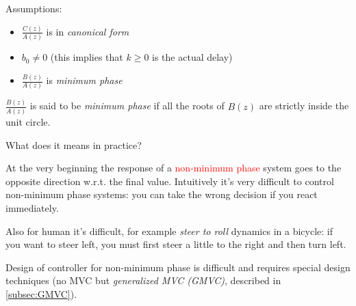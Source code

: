 Assumptions:
\begin{itemize}
    \item $\frac{C(z)}{A(z)}$ is in \emph{canonical form}
    \item $b_0\ne 0$ (this implies that $k \ge 0$ is the actual delay)
    \item $\frac{B(z)}{A(z)}$ is \emph{minimum phase}
\end{itemize}

\begin{remark}
    $\frac{B(z)}{A(z)}$ is said to be \emph{minimum phase} if all the roots of $B(z)$ are strictly inside the unit circle.

    What does it means in practice? 

    \begin{figure}[H]
        \centering
    \end{figure}

    At the very beginning the response of a \textcolor{red}{non-minimum phase} system goes to the opposite direction w.r.t. the final value. Intuitively it's very difficult to control non-minimum phase systems: you can take the wrong decision if you react immediately.

    Also for human it's difficult, for example \emph{steer to roll} dynamics in a bicycle: if you want to steer left, you must first steer a little to the right and then turn left.

    Design of controller for non-minimum phase is difficult and requires special design techniques (no MVC but \emph{generalized MVC (GMVC)}, described in \ref{subsec:GMVC}).
\end{remark}

